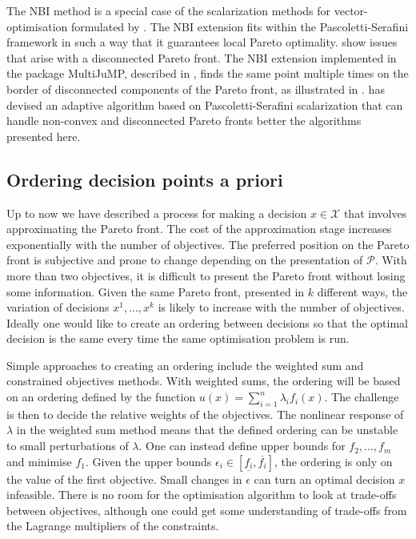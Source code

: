 \documentclass[main.tex]{subfiles}
\begin{document}
The NBI method is a special case of the scalarization methods for
vector-optimisation formulated by
\citet{pascoletti1984scalarizing}. The NBI extension fits within the
Pascoletti-Serafini framework in such a way that it guarantees local
Pareto optimality.  show
issues that arise with a disconnected Pareto front.
The NBI extension implemented in the package MultiJuMP, described in
, finds the same point multiple times on the
border of disconnected components of the Pareto front, as illustrated
in .
\citet{eichfelder2009adaptive} has devised an adaptive algorithm based
on Pascoletti-Serafini scalarization that can handle non-convex
and disconnected Pareto fronts better the algorithms presented here.



\subsection{Ordering decision points a priori}\label{sec:multi_apriori}
Up to now we have described a process for making a decision
$x\in\mathcal{X}$ that involves approximating the Pareto
front.
The cost of the approximation stage increases exponentially with the
number of objectives. The preferred position on the Pareto front is
subjective and prone to change depending on the presentation of
$\mathcal{P}$. With more than two objectives, it is difficult to
present the Pareto front without losing some information.
Given the same Pareto front, presented in
$k$ different ways, the variation of decisions $x^1,\dots,x^k$ is likely to
increase with the number of objectives.
Ideally one would like to create an ordering between decisions so
that the optimal decision is the same every time the same optimisation
problem is run.

Simple approaches to creating an ordering include the weighted sum
and constrained objectives methods.
With weighted sums, the ordering will be based on
an ordering defined by the function $u(x)=\sum_{i=1}^n\lambda_if_i(x)$.
The challenge is then to decide the relative weights of the objectives. The
nonlinear response of $\lambda$ in the weighted sum method means that
the defined ordering can be unstable to small perturbations of $\lambda$.
One can instead define upper bounds for $f_2,\dots,f_m$ and minimise
$f_1$.
Given the upper bounds
$\epsilon_i\in[\underline{f_i},\overline{f_i}]$,
the ordering is only on the value of the first objective.
Small changes in $\epsilon$ can turn an optimal decision $x$
infeasible. There is no room for the optimisation algorithm to
look at trade-offs between objectives, although one could get some
understanding of trade-offs from the
Lagrange multipliers of the constraints.
\end{document}

